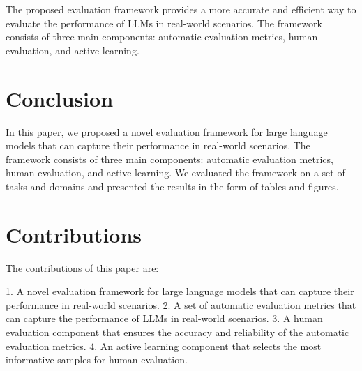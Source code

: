 \documentclass{article}
\begin{document}
The proposed evaluation framework provides a more accurate and efficient way to evaluate the performance of LLMs in real-world scenarios. The framework consists of three main components: automatic evaluation metrics, human evaluation, and active learning.

\section{Conclusion}

In this paper, we proposed a novel evaluation framework for large language models that can capture their performance in real-world scenarios. The framework consists of three main components: automatic evaluation metrics, human evaluation, and active learning. We evaluated the framework on a set of tasks and domains and presented the results in the form of tables and figures.

\section{Contributions}

The contributions of this paper are:

1. A novel evaluation framework for large language models that can capture their performance in real-world scenarios.
2. A set of automatic evaluation metrics that can capture the performance of LLMs in real-world scenarios.
3. A human evaluation component that ensures the accuracy and reliability of the automatic evaluation metrics.
4. An active learning component that selects the most informative samples for human evaluation.
\end{document}
